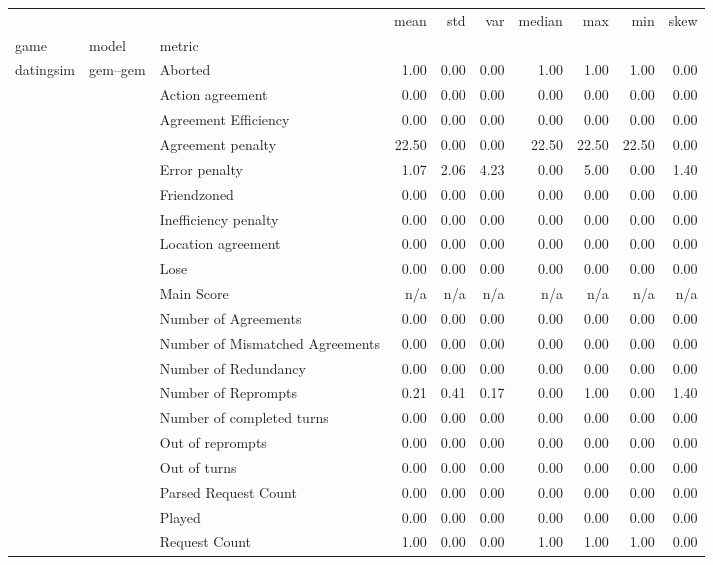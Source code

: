 \begin{tabular}{lllrrrrrrr}
\toprule
 &  &  & mean & std & var & median & max & min & skew \\
game & model & metric &  &  &  &  &  &  &  \\
\midrule
\multirow[t]{189}{*}{datingsim} & \multirow[t]{27}{*}{gem--gem} & Aborted & 1.00 & 0.00 & 0.00 & 1.00 & 1.00 & 1.00 & 0.00 \\
 &  & Action agreement & 0.00 & 0.00 & 0.00 & 0.00 & 0.00 & 0.00 & 0.00 \\
 &  & Agreement Efficiency & 0.00 & 0.00 & 0.00 & 0.00 & 0.00 & 0.00 & 0.00 \\
 &  & Agreement penalty & 22.50 & 0.00 & 0.00 & 22.50 & 22.50 & 22.50 & 0.00 \\
 &  & Error penalty & 1.07 & 2.06 & 4.23 & 0.00 & 5.00 & 0.00 & 1.40 \\
 &  & Friendzoned & 0.00 & 0.00 & 0.00 & 0.00 & 0.00 & 0.00 & 0.00 \\
 &  & Inefficiency penalty & 0.00 & 0.00 & 0.00 & 0.00 & 0.00 & 0.00 & 0.00 \\
 &  & Location agreement & 0.00 & 0.00 & 0.00 & 0.00 & 0.00 & 0.00 & 0.00 \\
 &  & Lose & 0.00 & 0.00 & 0.00 & 0.00 & 0.00 & 0.00 & 0.00 \\
 &  & Main Score & n/a & n/a & n/a & n/a & n/a & n/a & n/a \\
 &  & Number of Agreements & 0.00 & 0.00 & 0.00 & 0.00 & 0.00 & 0.00 & 0.00 \\
 &  & Number of Mismatched Agreements & 0.00 & 0.00 & 0.00 & 0.00 & 0.00 & 0.00 & 0.00 \\
 &  & Number of Redundancy & 0.00 & 0.00 & 0.00 & 0.00 & 0.00 & 0.00 & 0.00 \\
 &  & Number of Reprompts & 0.21 & 0.41 & 0.17 & 0.00 & 1.00 & 0.00 & 1.40 \\
 &  & Number of completed turns & 0.00 & 0.00 & 0.00 & 0.00 & 0.00 & 0.00 & 0.00 \\
 &  & Out of reprompts & 0.00 & 0.00 & 0.00 & 0.00 & 0.00 & 0.00 & 0.00 \\
 &  & Out of turns & 0.00 & 0.00 & 0.00 & 0.00 & 0.00 & 0.00 & 0.00 \\
 &  & Parsed Request Count & 0.00 & 0.00 & 0.00 & 0.00 & 0.00 & 0.00 & 0.00 \\
 &  & Played & 0.00 & 0.00 & 0.00 & 0.00 & 0.00 & 0.00 & 0.00 \\
 &  & Request Count & 1.00 & 0.00 & 0.00 & 1.00 & 1.00 & 1.00 & 0.00 \\

\end{tabular}
